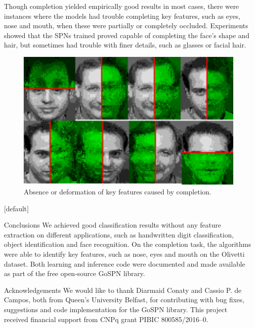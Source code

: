 \documentclass[final,hyperref={pdfpagelabels=false},notheorems]{beamer}
\theoremstyle{thesisstyle}
\newcommand{\pskip}{\vskip 0.5cm}
\begin{document}
\begin{frame}[t]
\begin{columns}[t]
\begin{column}{.5225\textwidth}
\begin{block}{}
      Though completion yielded empirically good results in most cases, there were instances where
      the models had trouble completing key features, such as eyes, nose and mouth, when these were
      partially or completely occluded. Experiments showed that the SPNs trained proved capable of
      completing the face's shape and hair, but sometimes had trouble with finer details, such as
      glasses or facial hair.\pskip

      \begin{figure}[h]
        \centering\includegraphics[width=40cm]{imgs/notfine.png}
        \caption{Absence or deformation of key features caused by completion.}
      \end{figure}
    \end{block}
    [default]

    \begin{block}{Conclusions}
      We achieved good classification results without any feature extraction on different
      applications, such as handwritten digit classification, object identification and face
      recognition. On the completion task, the algorithms were able to identify key features, such
      as nose, eyes and mouth on the Olivetti dataset. Both learning and inference code were
      documented and made available as part of the free open-source GoSPN library.
    \end{block}

    \begin{block}{Acknowledgements}
      We would like to thank Diarmaid Conaty and Cassio P. de Campos, both from Queen's University
      Belfast, for contributing with bug fixes, suggestions and code implementation for the GoSPN
      library. This project received financial support from CNPq grant PIBIC 800585/2016--0.
    \end{block}


\end{column}
\end{columns}
\end{frame}
\end{document}
